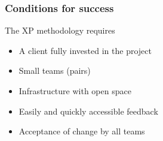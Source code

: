 \begin{frame}
    \frametitle{Conditions for success}
        \begin{block}
        The XP methodology requires            
            \begin{itemize}
                \item A client fully invested in the project
                \item Small teams (pairs)
                \item Infrastructure with open space
                \item Easily and quickly accessible feedback
                \item Acceptance of change by all teams
            \end{itemize}
        \end{block}
\end{frame}
